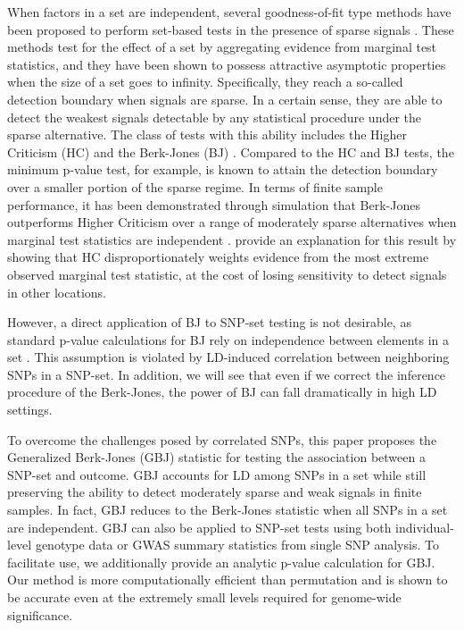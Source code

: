 \documentclass[12pt]{article}
\begin{document}
When factors in a set are independent, several goodness-of-fit type methods have been 
proposed to perform set-based tests in the presence of sparse signals \citep{HC, Phi_divergences, ALR}.
These methods test for the effect of a set by aggregating evidence from marginal test 
statistics, and they have been shown to possess attractive asymptotic properties when 
the size of a set goes to infinity.
Specifically, they reach a so-called detection boundary when signals are sparse.
In a certain sense, they are able to detect the weakest signals detectable by any 
statistical procedure under the sparse alternative.
The class of tests with this ability includes the Higher Criticism (HC) \citep{HC} and 
the Berk-Jones (BJ) \citep{BJ}.
Compared to the HC and BJ tests, the minimum p-value test, for example, is known 
to attain the detection boundary over a smaller portion of the sparse regime.
In terms of finite sample performance, it has been demonstrated through simulation 
that Berk-Jones outperforms Higher Criticism over a range of moderately sparse 
alternatives when marginal test statistics are independent \citep{ALR, LiSiegmund}.
\citet{HC} provide an explanation for this result by showing that HC disproportionately 
weights evidence from the most extreme observed marginal test statistic, at the cost 
of losing sensitivity to detect signals in other locations. 

However, a direct application of BJ to SNP-set testing is not desirable, as standard 
p-value calculations for BJ rely on independence between elements in a set \citep{boundary_crossing}. 
This assumption is violated by LD-induced correlation between neighboring SNPs 
in a SNP-set.
In addition, we will see that even if we correct the inference procedure of the Berk-Jones, 
the power of BJ can fall dramatically in high LD settings.

To overcome the challenges posed by correlated SNPs, this paper proposes the 
Generalized Berk-Jones (GBJ) statistic for testing the association between a SNP-set 
and outcome. 
GBJ accounts for LD among SNPs in a set while still preserving the ability to detect 
moderately sparse and weak signals in finite samples. 
In fact, GBJ reduces to the Berk-Jones statistic when all SNPs in a set are independent. 
GBJ can also be applied to SNP-set tests using both individual-level genotype data 
or GWAS summary statistics from single SNP analysis.
To facilitate use, we additionally provide an analytic p-value calculation for GBJ. 
Our method is more computationally efficient than permutation and is shown to 
be accurate even at the extremely small levels required for genome-wide significance. 
\end{document}
